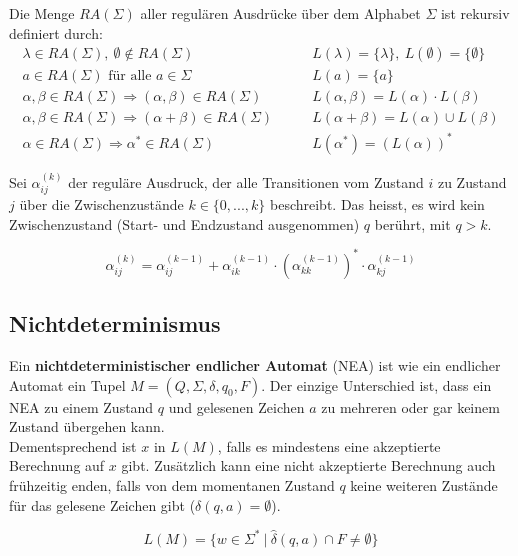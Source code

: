 \documentclass[11pt]{article}
\begin{document}
Die Menge $RA(\Sigma)$ aller regul{\"a}ren Ausdr{\"u}cke {\"u}ber dem Alphabet $\Sigma$ ist rekursiv definiert durch:
\begin{equation*}
\begin{split}
	\lambda \in RA(\Sigma),\ \emptyset \not\in RA(\Sigma) \qquad & L(\lambda) = \{\lambda\},\ L(\emptyset) = \{\emptyset\} \\
	a \in RA(\Sigma) \text{ f{\"u}r alle } a \in \Sigma \qquad & L(a) = \{a\} \\
	\alpha, \beta \in RA(\Sigma) \Rightarrow (\alpha, \beta) \in RA(\Sigma) \qquad & L(\alpha, \beta) = L(\alpha) \cdot L(\beta) \\
	\alpha, \beta \in RA(\Sigma) \Rightarrow (\alpha + \beta) \in RA(\Sigma) \qquad & L(\alpha + \beta) = L(\alpha) \cup L(\beta) \\
	\alpha \in RA(\Sigma) \Rightarrow \alpha^* \in RA(\Sigma) \qquad & L(\alpha^*) = (L(\alpha))^*
\end{split}
\end{equation*}

Sei $\alpha_{ij}^{(k)}$ der regul{\"a}re Ausdruck, der alle Transitionen vom Zustand $i$ zu Zustand $j$ {\"u}ber die Zwischenzust{\"a}nde $k \in \{0,...,k\}$ beschreibt. Das heisst, es wird kein Zwischenzustand (Start- und Endzustand ausgenommen) $q$ ber{\"u}hrt, mit $q > k$.

\begin{equation*}
	\alpha_{ij}^{(k)} = \alpha_{ij}^{(k-1)} + \alpha_{ik}^{(k-1)}\cdot (\alpha_{kk}^{(k-1)})^* \cdot \alpha_{kj}^{(k-1)}
\end{equation*}
	
\subsection{Nichtdeterminismus}	

Ein \textbf{nichtdeterministischer endlicher Automat} (NEA) ist wie ein endlicher Automat ein Tupel $M = (Q, \Sigma, \delta, q_0, F)$. Der einzige Unterschied ist, dass ein NEA zu einem Zustand $q$ und gelesenen Zeichen $a$ zu mehreren oder gar keinem Zustand {\"u}bergehen kann. \\
Dementsprechend ist $x$ in $L(M)$, falls es mindestens eine akzeptierte Berechnung auf $x$ gibt. Zus{\"a}tzlich kann eine nicht akzeptierte Berechnung auch fr{\"u}hzeitig enden, falls von dem momentanen Zustand $q$ keine weiteren Zust{\"a}nde f{\"u}r das gelesene Zeichen gibt ($\delta(q, a) = \emptyset$).

\begin{equation*}
	L(M) = \{w \in \Sigma^*\ |\ \hat\delta(q, a) \cap F \neq \emptyset\}
\end{equation*}
\end{document}
